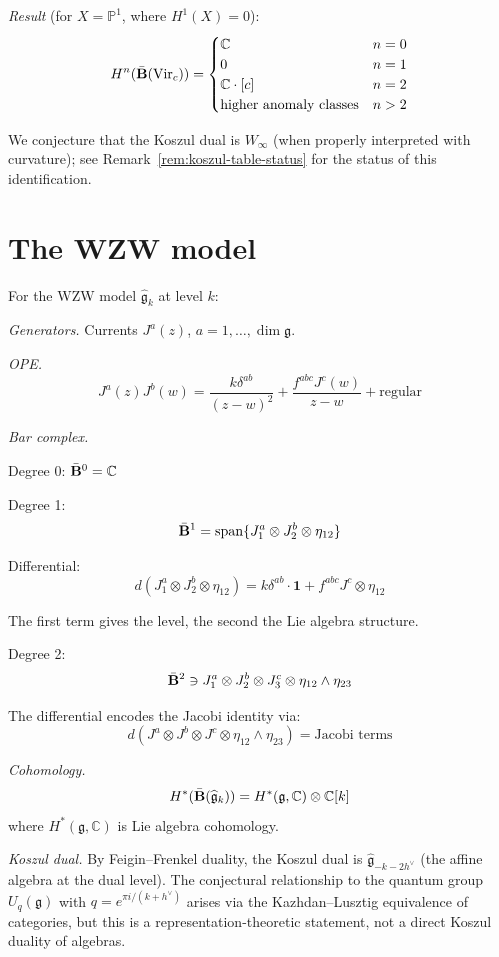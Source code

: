 \begin{example}
\emph{Result} (for $X = \mathbb{P}^1$, where $H^1(X) = 0$):
\[H^n(\bar{\mathbf{B}}(\text{Vir}_c)) = \begin{cases}
\mathbb{C} & n = 0 \\
0 & n = 1 \\
\mathbb{C} \cdot [c] & n = 2 \\
\text{higher anomaly classes} & n > 2
\end{cases}\]

We conjecture that the Koszul dual is $W_\infty$ (when properly interpreted with curvature); see Remark~\ref{rem:koszul-table-status} for the status of this identification.
\end{example}

\section{The WZW model}

\begin{example}
For the WZW model $\widehat{\mathfrak{g}}_k$ at level $k$:

\noindent\emph{Generators.} Currents $J^a(z)$, $a = 1, \ldots, \dim \mathfrak{g}$.

\noindent\emph{OPE.}
\[J^a(z)J^b(w) = \frac{k\delta^{ab}}{(z-w)^2} + \frac{f^{abc}J^c(w)}{z-w} + \text{regular}\]

\noindent\emph{Bar complex.}

Degree 0: $\bar{\mathbf{B}}^0 = \mathbb{C}$

Degree 1: 
\[\bar{\mathbf{B}}^1 = \text{span}\{J^a_1 \otimes J^b_2 \otimes \eta_{12}\}\]

Differential:
\[d(J^a_1 \otimes J^b_2 \otimes \eta_{12}) = k\delta^{ab} \cdot \mathbf{1} + f^{abc}J^c \otimes \eta_{12}\]

The first term gives the level, the second the Lie algebra structure.

Degree 2:
\[\bar{\mathbf{B}}^2 \ni J^a_1 \otimes J^b_2 \otimes J^c_3 \otimes \eta_{12} \wedge \eta_{23}\]

The differential encodes the Jacobi identity via:
\[d(J^a \otimes J^b \otimes J^c \otimes \eta_{12} \wedge \eta_{23}) = \text{Jacobi terms}\]

\noindent\emph{Cohomology.}
\[H^*(\bar{\mathbf{B}}(\widehat{\mathfrak{g}}_k)) = H^*(\mathfrak{g}, \mathbb{C}) \otimes \mathbb{C}[k]\]
where $H^*(\mathfrak{g}, \mathbb{C})$ is Lie algebra cohomology.

\noindent\emph{Koszul dual.} By Feigin--Frenkel duality, the Koszul dual is $\widehat{\mathfrak{g}}_{-k-2h^\vee}$ (the affine algebra at the dual level). The conjectural relationship to the quantum group $U_q(\mathfrak{g})$ with $q = e^{\pi i/(k+h^\vee)}$ arises via the Kazhdan--Lusztig equivalence of categories, but this is a representation-theoretic statement, not a direct Koszul duality of algebras.
\end{example}


